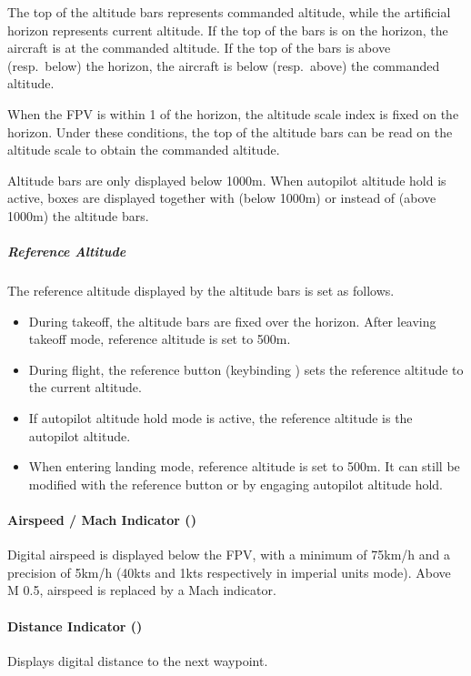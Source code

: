The top of the altitude bars represents commanded altitude,
while the artificial horizon represents current altitude.
If the top of the bars is on the horizon, the aircraft is at the commanded altitude.
If the top of the bars is above (resp.\ below) the horizon,
the aircraft is below (resp.\ above) the commanded altitude.

When the FPV is within 1\textdegree{} of the horizon,
the altitude scale index is fixed on the horizon.
Under these conditions, the top of the altitude bars
can be read on the altitude scale to obtain the commanded altitude.

Altitude bars are only displayed below 1000m.
When autopilot altitude hold is active, boxes are displayed together with
(below 1000m) or instead of (above 1000m) the altitude bars.

\subparagraph{Reference Altitude}
The reference altitude displayed by the altitude bars is set as follows.
\begin{itemize}[noitemsep]
  \item During takeoff, the altitude bars are fixed over the horizon.
    After leaving takeoff mode, reference altitude is set to 500m.
  \item During flight, the reference button (keybinding )
    sets the reference altitude to the current altitude.
  \item If autopilot altitude hold mode is active,
    the reference altitude is the autopilot altitude.
  \item When entering landing mode, reference altitude is set to 500m.
    It can still be modified with the reference button or by engaging autopilot altitude hold.
\end{itemize}

\paragraph{Airspeed / Mach Indicator ()}
Digital airspeed is displayed below the FPV,
with a minimum of 75km/h and a precision of 5km/h
(40kts and 1kts respectively in imperial units mode).
Above M 0.5, airspeed is replaced by a Mach indicator.

\paragraph{Distance Indicator ()}
Displays digital distance to the next waypoint.

